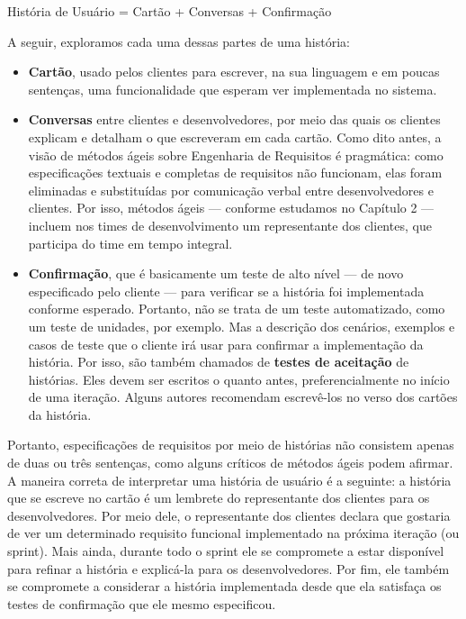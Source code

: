\documentclass[
  11pt,
  twoside]{book}
\renewenvironment{quote}{\centering \vspace{1.5ex} \begin{tcolorbox}[colback=backcolor, width=4.9in]}{\end{tcolorbox}}
\begin{document}
\begin{quote}
História de Usuário = Cartão + Conversas + Confirmação
\end{quote}

A seguir, exploramos cada uma dessas partes de uma história:

\begin{itemize}
\item
  \textbf{Cartão}, usado pelos clientes para escrever, na sua linguagem
  e em poucas sentenças, uma funcionalidade que esperam ver implementada
  no sistema.
\item
  \textbf{Conversas} entre clientes e desenvolvedores, por meio das
  quais os clientes explicam e detalham o que escreveram em cada cartão.
  Como dito antes, a visão de métodos ágeis sobre Engenharia de
  Requisitos é pragmática: como especificações textuais e completas de
  requisitos não funcionam, elas foram eliminadas e substituídas por
  comunicação verbal entre desenvolvedores e clientes. Por isso, métodos
  ágeis --- conforme estudamos no Capítulo 2 --- incluem nos times de
  desenvolvimento um representante dos clientes, que participa do time
  em tempo integral.
\item
  \textbf{Confirmação}, que é basicamente um teste de alto nível --- de
  novo especificado pelo cliente --- para verificar se a história foi
  implementada conforme esperado. Portanto, não se trata de um teste
  automatizado, como um teste de unidades, por exemplo. Mas a descrição
  dos cenários, exemplos e casos de teste que o cliente irá usar para
  confirmar a implementação da história. Por isso, são também chamados
  de \textbf{testes de aceitação} de histórias. Eles devem ser escritos
  o quanto antes, preferencialmente no início de uma iteração. Alguns
  autores recomendam escrevê-los no verso dos cartões da história.
\end{itemize}

Portanto, especificações de requisitos por meio de histórias não
consistem apenas de duas ou três sentenças, como alguns críticos de
métodos ágeis podem afirmar. A maneira correta de interpretar uma
história de usuário é a seguinte: a história que se escreve no cartão é
um lembrete do representante dos clientes para os desenvolvedores. Por
meio dele, o representante dos clientes declara que gostaria de ver um
determinado requisito funcional implementado na próxima iteração (ou
sprint). Mais ainda, durante todo o sprint ele se compromete a estar
disponível para refinar a história e explicá-la para os desenvolvedores.
Por fim, ele também se compromete a considerar a história implementada
desde que ela satisfaça os testes de confirmação que ele mesmo
especificou.
\end{document}
